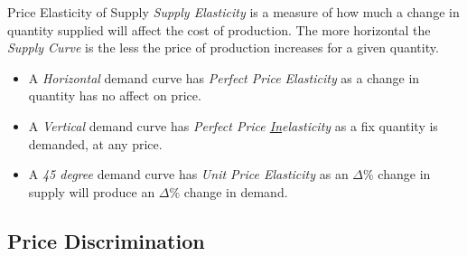 \documentclass[11pt,a4paper]{article}
\begin{document}
\begin{definition}{Price Elasticity of Supply}
  \textit{Supply Elasticity} is a measure of how much a change in quantity supplied will affect the cost of production. The more horizontal the \textit{Supply Curve} is the less the price of production increases for a given quantity.
  \begin{itemize}
    \item A \textit{Horizontal} demand curve has \textit{Perfect Price Elasticity} as a change in quantity has no affect on price.
    \item A \textit{Vertical} demand curve has \textit{Perfect Price \underline{In}elasticity} as a fix quantity is demanded, at any price.
    \item A \textit{45 degree} demand curve has \textit{Unit Price Elasticity} as an $\Delta\%$ change in supply will produce an $\Delta\%$ change in demand.
  \end{itemize}
\end{definition}

\subsection{Price Discrimination}
\end{document}
